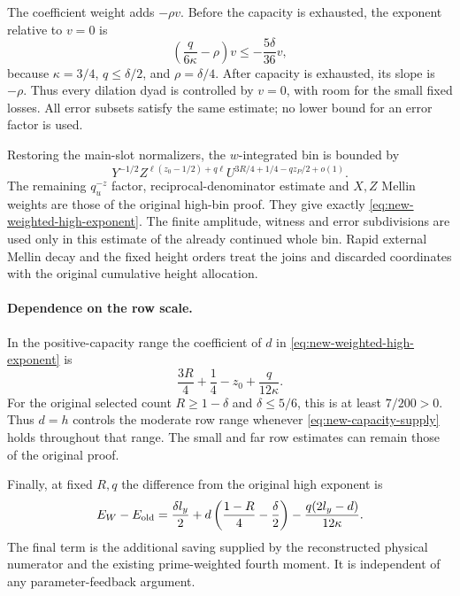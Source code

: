 The coefficient weight adds $-\rho v$.  Before the capacity is
exhausted, the exponent relative to $v=0$ is
\[
 \left(\frac q{6\kappa}-\rho\right)v
 \le-\frac{5\delta}{36}v,
\]
because $\kappa=3/4$, $q\le\delta/2$, and $\rho=\delta/4$.
After capacity is exhausted, its slope is $-\rho$. Thus every
dilation dyad is controlled by $v=0$, with room for the small fixed
losses. All error subsets satisfy the same estimate; no lower bound
for an error factor is used.

Restoring the main-slot normalizers, the $w$-integrated bin is bounded
by
\[
 Y^{-1/2}Z^{\ell(z_0-1/2)+q\ell}
 U^{3R/4+1/4-qz_P/2+o(1)}.
\]
The remaining $q_u^{-z}$ factor, reciprocal-denominator estimate and
$X,Z$ Mellin weights are those of the original high-bin proof.
They give exactly \eqref{eq:new-weighted-high-exponent}.  The finite
amplitude, witness and error subdivisions are used only in this
estimate of the already continued whole bin.  Rapid external Mellin
decay and the fixed height orders treat the joins and discarded
coordinates with the original cumulative height allocation.

\paragraph{Dependence on the row scale.}
In the positive-capacity range the coefficient of $d$ in
\eqref{eq:new-weighted-high-exponent} is
\[
 \frac{3R}{4}+\frac14-z_0+\frac q{12\kappa}.
\]
For the original selected count $R\ge1-\delta$ and
$\delta\le5/6$, this is at least $7/200>0$.  Thus $d=h$ controls
the moderate row range whenever \eqref{eq:new-capacity-supply} holds
throughout that range.  The small and far row estimates can remain
those of the original proof.

Finally, at fixed $R,q$ the difference from the original high exponent
is
\[
 E_W-E_{\rm old}
 =\frac{\delta l_y}{2}
   +d\left(\frac{1-R}{4}-\frac\delta2\right)
   -\frac{q(2l_y-d)}{12\kappa}.
\]
The final term is the additional saving supplied by the reconstructed
physical numerator and the existing prime-weighted fourth moment.
It is independent of any parameter-feedback argument.
